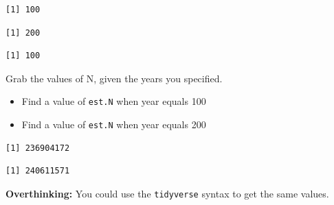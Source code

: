 \documentclass[
  letterpaper,
  DIV=11,
  numbers=noendperiod]{scrreprt}
\newenvironment{Shaded}{\begin{snugshade}}{\end{snugshade}}
\newcommand{\DocumentationTok}[1]{\textcolor[rgb]{0.37,0.37,0.37}{\textit{#1}}}
\newcommand{\NormalTok}[1]{\textcolor[rgb]{0.00,0.23,0.31}{#1}}
\newcommand{\OtherTok}[1]{\textcolor[rgb]{0.00,0.23,0.31}{#1}}
\newcommand{\SpecialCharTok}[1]{\textcolor[rgb]{0.37,0.37,0.37}{#1}}
\providecommand{\tightlist}{%
  \setlength{\itemsep}{0pt}\setlength{\parskip}{0pt}}
\begin{document}
\begin{verbatim}
[1] 100
\end{verbatim}

\begin{verbatim}
[1] 200
\end{verbatim}

\begin{verbatim}
[1] 100
\end{verbatim}

Grab the values of N, given the years you specified.

\begin{itemize}
\tightlist
\item
  Find a value of \texttt{est.N} when year equals 100
\item
  Find a value of \texttt{est.N} when year equals 200
\end{itemize}

\begin{Shaded}
\end{Shaded}

\begin{verbatim}
[1] 236904172
\end{verbatim}

\begin{verbatim}
[1] 240611571
\end{verbatim}

\textbf{Overthinking:} You could use the \texttt{tidyverse} syntax to
get the same values.
\end{document}
